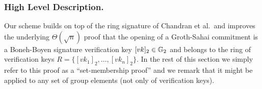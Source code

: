 

%
%
%


\subsubsection{High Level Description.} Our scheme builds on top of the ring signature of Chandran et al.~and improves the underlying $\Theta(\sqrt{n})$ proof that the opening of a Groth-Sahai commitment is a Boneh-Boyen signature verification key $[vk]_2\in\mathbb{G}_2$ and belongs to the ring of verification keys $R=\{[vk_1]_2,\ldots,[vk_n]_2\}$. In the rest of this section we simply refer to this proof as a ``set-membership proof'' and we remark that it might be applied to any set of group elements (not only of verification keys).

